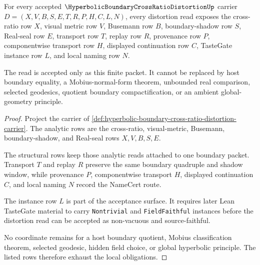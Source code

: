 \begin{theorem}
\label{thm:hyperbolic-boundary-cross-ratio-distortion-obligations}
For every accepted $\HyperbolicBoundaryCrossRatioDistortionUp$ carrier $D=(X,V,B,S,E,T,R,P,H,C,L,N)$, every distortion read exposes the cross-ratio row $X$, visual metric row $V$, Busemann row $B$, boundary-shadow row $S$, Real-seal row $E$, transport row $T$, replay row $R$, provenance row $P$, componentwise transport row $H$, displayed continuation row $C$, TasteGate instance row $L$, and local naming row $N$.

The read is accepted only as this finite packet. It cannot be replaced by host boundary equality, a Mobius-normal-form theorem, unbounded real comparison, selected geodesics, quotient boundary compactification, or an ambient global-geometry principle.
\end{theorem}
\begin{proof}
Project the carrier of \autoref{def:hyperbolic-boundary-cross-ratio-distortion-carrier}. The analytic rows are the cross-ratio, visual-metric, Busemann, boundary-shadow, and Real-seal rows $X,V,B,S,E$.

The structural rows keep those analytic reads attached to one boundary packet. Transport $T$ and replay $R$ preserve the same boundary quadruple and shadow window, while provenance $P$, componentwise transport $H$, displayed continuation $C$, and local naming $N$ record the NameCert route.

The instance row $L$ is part of the acceptance surface. It requires later Lean TasteGate material to carry \texttt{Nontrivial} and \texttt{FieldFaithful} instances before the distortion read can be accepted as non-vacuous and source-faithful.

No coordinate remains for a host boundary quotient, Mobius classification theorem, selected geodesic, hidden field choice, or global hyperbolic principle. The listed rows therefore exhaust the local obligations.
\end{proof}



